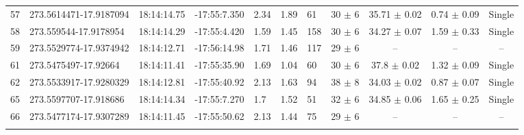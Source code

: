 \documentclass[longauth]{aa} %
\begin{document}
\begin{appendix}
\begin{table}[htbp!]
\begin{tabular}{llllllllccc}
57  &  273.5614471-17.9187094  &  18:14:14.75  &  -17:55:7.350  &  2.34  &  1.89  &  61  &  30 $\pm$ 6  &  35.71 $\pm$ 0.02  &  0.74 $\pm$ 0.09  &  Single \\
58  &  273.559544-17.9178954  &  18:14:14.29  &  -17:55:4.420  &  1.59  &  1.45  &  158  &  30 $\pm$ 6  &  34.27 $\pm$ 0.07  &  1.59 $\pm$ 0.33  &  Single \\
59  &  273.5529774-17.9374942  &  18:14:12.71  &  -17:56:14.98  &  1.71  &  1.46  &  117  &  29 $\pm$ 6  &  --  &  --  &  -- \\
61  &  273.5475497-17.92664  &  18:14:11.41  &  -17:55:35.90  &  1.69  &  1.04  &  60  &  30 $\pm$ 6  &  37.8 $\pm$ 0.02  &  1.32 $\pm$ 0.09  &  Single \\
62  &  273.5533917-17.9280329  &  18:14:12.81  &  -17:55:40.92  &  2.13  &  1.63  &  94  &  38 $\pm$ 8  &  34.03 $\pm$ 0.02  &  0.87 $\pm$ 0.07  &  Single \\
65  &  273.5597707-17.918686  &  18:14:14.34  &  -17:55:7.270  &  1.7  &  1.52  &  51  &  32 $\pm$ 6  &  34.85 $\pm$ 0.06  &  1.65 $\pm$ 0.25  &  Single \\
66  &  273.5477174-17.9307289  &  18:14:11.45  &  -17:55:50.62  &  2.13  &  1.44  &  75  &  29 $\pm$ 6  &  --  &  --  &  -- \\
\hline \noalign {\smallskip}
\end{tabular}
\end{table}



\end{appendix}
\end{document}
